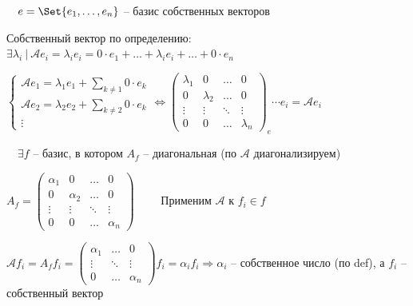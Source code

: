 \documentclass[12pt]{article}
\begin{document}
    \begin{MyProof}
        \fbox{$\Longleftarrow$} $\quad e = \Set{e_1, \dots, e_n}$ -- базис собственных векторов

        Собственный вектор по определению: $\exists \lambda_i \ | \ \mathcal{A}e_i = \lambda_i e_i = 0 \cdot e_1 + \dots + \lambda_i e_i + \dots + 0 \cdot e_n$

        $\begin{cases}
            \mathcal{A}e_1 = \lambda_1 e_1 + \sum_{k \neq 1} 0 \cdot e_k \\
            \mathcal{A}e_2 = \lambda_2 e_2 + \sum_{k \neq 2} 0 \cdot e_k \\
            \vdots
        \end{cases} \Longleftrightarrow \begin{pmatrix}
                                            \lambda_1 & 0         & \dots  & 0         \\
                                            0         & \lambda_2 & \dots  & 0         \\
                                            \vdots    & \vdots    & \ddots & \vdots    \\
                                            0         & 0         & \dots  & \lambda_n
        \end{pmatrix}_e \cdots e_i = \mathcal{A} e_i$

        \mediumvspace

        \fbox{$\Longrightarrow$} $\quad \exists f$ -- базис, в котором $A_f$ -- диагональная (по \Defs $\mathcal{A}$ диагонализируем)

        $A_f = \begin{pmatrix}
                \alpha_1 & 0        & \dots  & 0        \\
                0        & \alpha_2 & \dots  & 0        \\
                \vdots   & \vdots   & \ddots & \vdots   \\
                0        & 0        & \dots  & \alpha_n
        \end{pmatrix} \quad\quad$ Применим $\mathcal{A}$ к $f_i \in f$

        $\mathcal{A}f_i = A_f f_i = \begin{pmatrix}
                                        \alpha_1 & \dots  & 0        \\
                                        \vdots   & \ddots & \vdots   \\
                                        0        & \dots  & \alpha_n
        \end{pmatrix} f_i = \alpha_i f_i \Longrightarrow \alpha_i$ -- собственное число (по def), а $f_i$ -- собственный вектор
    \end{MyProof}
\end{document}
